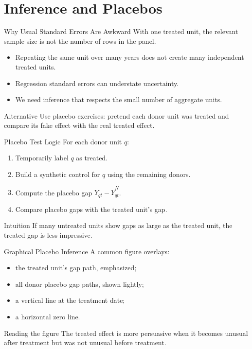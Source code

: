 \documentclass[11pt,aspectratio=169]{beamer}
\newcommand{\derivbutton}[1]{\vspace{0.4em}\hfill\hyperlink{app:#1}{\beamerbutton{Appendix details}}}
\begin{document}
\section{Inference and Placebos}

\begin{frame}{Why Usual Standard Errors Are Awkward}
  With one treated unit, the relevant sample size is not the number of rows in the panel.
  \begin{itemize}
    \item Repeating the same unit over many years does not create many independent treated units.
    \item Regression standard errors can understate uncertainty.
    \item We need inference that respects the small number of aggregate units.
  \end{itemize}
  \begin{block}{Alternative}
    Use placebo exercises: pretend each donor unit was treated and compare its fake effect with the real treated effect.
  \end{block}
\end{frame}

\begin{frame}{Placebo Test Logic}
  \hypertarget{main:placebo-logic}{}
  For each donor unit \(q\):
  \begin{enumerate}
    \item Temporarily label \(q\) as treated.
    \item Build a synthetic control for \(q\) using the remaining donors.
    \item Compute the placebo gap \(Y_{qt}-\widehat{Y}^N_{qt}\).
    \item Compare placebo gaps with the treated unit's gap.
  \end{enumerate}
  \begin{block}{Intuition}
    If many untreated units show gaps as large as the treated unit, the treated gap is less impressive.
  \end{block}
  \derivbutton{placebo}
\end{frame}

\begin{frame}{Graphical Placebo Inference}
  A common figure overlays:
  \begin{itemize}
    \item the treated unit's gap path, emphasized;
    \item all donor placebo gap paths, shown lightly;
    \item a vertical line at the treatment date;
    \item a horizontal zero line.
  \end{itemize}
  \begin{block}{Reading the figure}
    The treated effect is more persuasive when it becomes unusual after treatment but was not unusual before treatment.
  \end{block}
\end{frame}
\end{document}
